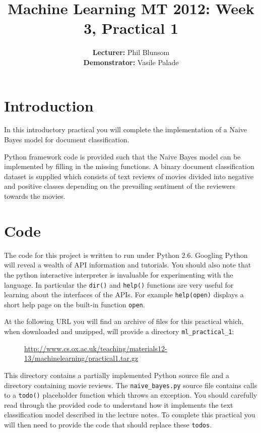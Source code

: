 \documentclass[11pt]{article}
\title{Machine Learning MT 2012: Week 3, Practical 1}
\author{{\bf Lecturer:} Phil Blunsom\\
        {\bf Demonstrator:} Vasile Palade}
\date{}
\begin{document}
\maketitle

\section*{Introduction}
In this introductory practical you will complete the implementation of a Naive Bayes model for document classification.

Python framework code is provided such that the Naive Bayes model can be implemented by filling in the missing functions.
A binary document classification dataset is supplied which consists of text reviews of movies divided into negative and positive classes depending on the prevailing sentiment of the reviewers towards the movies.


\section*{Code}
The code for this project is written to run under Python 2.6. 
Googling Python will reveal a wealth of API information and tutorials.
You should also note that the python interactive interpreter is invaluable for experimenting with the language.
In particular the {\tt dir()} and {\tt help()} functions are very useful for learning about the interfaces of the APIs.
For example {\tt help(open)} displays a short help page on the built-in function {\tt open}. 

At the following URL you will find an archive of files for this practical which, when downloaded and unzipped, will provide a directory {\tt ml\_practical\_1}:

\begin{figure}[h]
\footnotesize 
\begin{center}
\url{http://www.cs.ox.ac.uk/teaching/materials12-13/machinelearning/practical1.tar.gz}
\end{center}
\end{figure}
This directory contains a partially implemented Python source file and a directory containing movie reviews.
The {\tt naive\_bayes.py} source file contains calls to a {\tt todo()} placeholder function which throws an exception.
You should carefully read through the provided code to understand how it implements the text classification model described in the lecture notes.
To complete this practical you will then need to provide the code that should replace these {\tt todos}.
\end{document}
